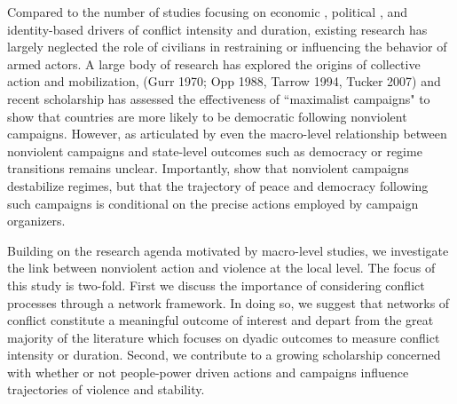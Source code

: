 
Compared to the number of studies focusing on economic \citep{collier04b}, political \citep{humphreys08}, and identity-based \citep{cederman10b} drivers of conflict intensity and duration, existing research has largely neglected the role of civilians in restraining or influencing the behavior of armed actors. A large body of research has explored the origins of collective action and mobilization, (Gurr 1970; Opp 1988, Tarrow 1994, Tucker 2007) and recent scholarship has assessed the effectiveness of ``maximalist campaigns" \citep{chenoweth2011} to show that countries are more likely to be democratic following nonviolent campaigns. However, as articulated by \cite{celestino2013} even the macro-level relationship between nonviolent campaigns and state-level outcomes such as democracy or regime transitions remains unclear. Importantly, \cite{celestino2013} show that nonviolent campaigns destabilize regimes, but that the trajectory of peace and democracy following such campaigns is conditional on the precise actions employed by campaign organizers. 

Building on the research agenda motivated by macro-level studies, we investigate the link between nonviolent action and violence at the local level. The focus of this study is two-fold. First we discuss the importance of considering conflict processes through a network framework. In doing so, we suggest that networks of conflict constitute a meaningful outcome of interest and depart from the great majority of the literature which focuses on dyadic outcomes to measure conflict intensity or duration. Second, we contribute to a growing scholarship concerned with whether or not people-power driven actions and campaigns influence trajectories of violence and stability. 


